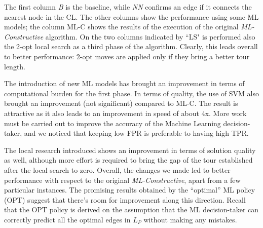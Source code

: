 \documentclass{article}
\begin{document}
The first column \textit{B} is the baseline, while \textit{NN} confirms an edge if it connects the nearest node in the CL.
The other columns show the performance using some ML models; the column ML-C shows the results of the execution of the original \emph{ML-Constructive} algorithm. 
On the two columns indicated by ``LS" is performed also the 2-opt local search as a third phase of the algorithm. Clearly, this leads overall to better performance: 2-opt moves are applied only if they bring a better tour length.

The introduction of new ML models has brought an improvement in terms of computational burden for the first phase.
In terms of quality, the use of SVM also brought an improvement (not significant) compared to ML-C.
The result is attractive as it also leads to an improvement in speed of about 4x.
More work must be carried out to improve the accuracy of the Machine Learning decision-taker, and
we noticed that keeping low FPR is preferable to having high TPR.

\vspace{5 pt}

The local research introduced shows an improvement in terms of solution quality as well, although more effort is required to bring the gap of the tour established after the local search to zero.
Overall, the changes we made led to better performance with respect to the original \emph{ML-Constructive}, apart from a few particular instances.
The promising results obtained by the ``optimal'' ML policy (OPT) suggest that there's room for improvement along this direction. 
Recall that the OPT policy is derived on the assumption that the ML decision-taker can correctly predict all the optimal edges in $L_P$ without making any mistakes.


\end{document}
